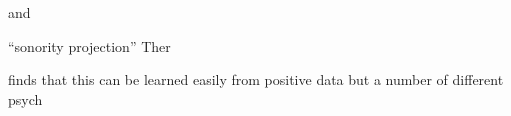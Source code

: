 \citet{NiChiosain1993} and \citet{Ito1995b} 

``sonority projection''
Ther

\citet{Daland2011b} finds that this can be learned easily from positive data but a number of different psych


